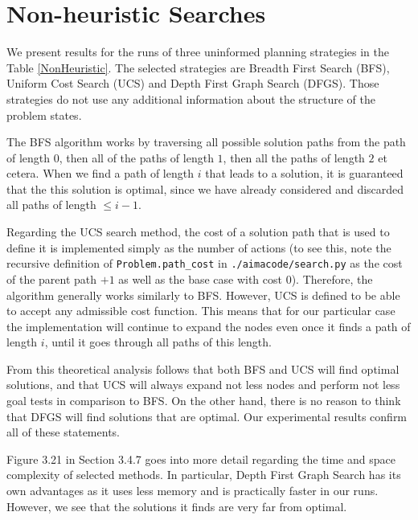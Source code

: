 \documentclass[oneside]{article}   	%
\begin{document}
\section{Non-heuristic Searches}

We present results for the runs of three uninformed planning strategies in the Table \ref{NonHeuristic}. The selected strategies are Breadth First Search (BFS), Uniform Cost Search (UCS) and Depth First Graph Search (DFGS). Those strategies do not use any additional information about the structure of the problem states.

The BFS algorithm works by traversing all possible solution paths from the path of length $0$, then all of the paths of length $1$, then all the paths of length $2$ et cetera. When we find a path of length $i$ that leads to a solution, it is guaranteed that the this solution is optimal, since we have already considered and discarded all paths of length $\le i-1$.

Regarding the UCS search method, the cost of a solution path that is used to define it is implemented simply as the number of actions (to see this, note the recursive definition of \texttt{Problem.path\_cost} in \texttt{./aimacode/search.py} as the cost of the parent path $+1$ as well as the base case with cost 0). Therefore, the algorithm generally works similarly to BFS. However, UCS is defined to be able to accept any admissible cost function. This means that for our particular case the implementation will continue to expand the nodes even once it finds a path of length $i$, until it goes through all paths of this length.

From this theoretical analysis follows that both BFS and UCS will find optimal solutions, and that UCS will always expand not less nodes and perform not less goal tests in comparison to BFS. On the other hand, there is no reason to think that DFGS will find solutions that are optimal. Our experimental results confirm all of these statements.

Figure 3.21 in Section 3.4.7 goes into more detail regarding the time and space complexity of selected methods. In particular, Depth First Graph Search has its own advantages as it uses less memory and is practically faster in our runs. However, we see that the solutions it finds are very far from optimal.
\end{document}

